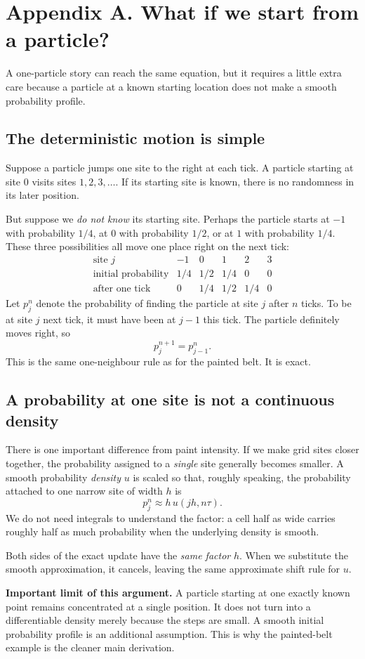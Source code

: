 \documentclass[11pt,a4paper]{article}
\newcommand{\substart}[1]{\Needspace{5\baselineskip}\subsection{#1}}
\begin{document}
\clearpage
\section*{Appendix A. What if we start from a particle?}
A one-particle story can reach the same equation, but it requires a little extra care because a particle at a known starting location does not make a smooth probability profile.

\substart{The deterministic motion is simple}
Suppose a particle jumps one site to the right at each tick. A particle starting at site $0$ visits sites $1,2,3,\ldots$. If its starting site is known, there is no randomness in its later position.

But suppose we \emph{do not know} its starting site. Perhaps the particle starts at $-1$ with probability $1/4$, at $0$ with probability $1/2$, or at $1$ with probability $1/4$. These three possibilities all move one place right on the next tick:
\[
\begin{array}{c|rrrrr}
\text{site }j&-1&0&1&2&3\\\hline
\text{initial probability}&1/4&1/2&1/4&0&0\\
\text{after one tick}&0&1/4&1/2&1/4&0
\end{array}
\]
Let $p_j^n$ denote the probability of finding the particle at site $j$ after $n$ ticks. To be at site $j$ next tick, it must have been at $j-1$ this tick. The particle definitely moves right, so
\[
\boxed{p_j^{n+1}=p_{j-1}^{n}.}
\]
This is the same one-neighbour rule as for the painted belt. It is exact.

\substart{A probability at one site is not a continuous density}
There is one important difference from paint intensity. If we make grid sites closer together, the probability assigned to a \emph{single} site generally becomes smaller. A smooth probability \emph{density} $u$ is scaled so that, roughly speaking, the probability attached to one narrow site of width $h$ is
\[
p_j^n\approx h\,u(jh,n\tau).
\]
We do not need integrals to understand the factor: a cell half as wide carries roughly half as much probability when the underlying density is smooth.

Both sides of the exact update have the \emph{same factor} $h$. When we substitute the smooth approximation, it cancels, leaving the same approximate shift rule for $u$.

\textbf{Important limit of this argument.} A particle starting at one exactly known point remains concentrated at a single position. It does not turn into a differentiable density merely because the steps are small. A smooth initial probability profile is an additional assumption. This is why the painted-belt example is the cleaner main derivation.
\end{document}
